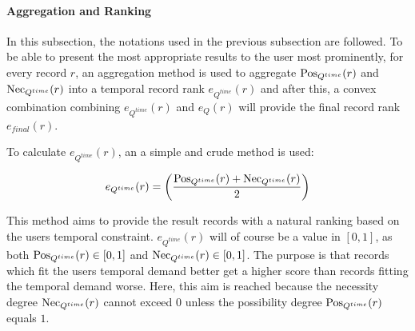 %
%
%



\paragraph{\textbf{Aggregation and Ranking}} 
In this subsection, the notations used in the previous subsection are followed. To be able to present the most appropriate results to the user most prominently, for every record $r$, an aggregation method is used to aggregate $\operatorname{Pos}_{Q^{time}}(r)$ and $\operatorname{Nec}_{Q^{time}}(r)$ into a temporal record rank $e_{Q^{time}}(r)$ and after this, a convex combination combining $e_{Q^{time}}(r)$ and $e_{Q}(r)$ will provide the final record rank $e_{final}(r)$.


To calculate $e_{Q^{time}}(r)$, an a simple and crude method is used:

\begin{equation}
\label{eq:temporal-eval}
e_{Q^{time}}(r) = \left(\frac{\Pos_{Q^{time}}(r)+\Nec_{Q^{time}}(r)}{2}\right)
\end{equation}

This method aims to provide the result records with a natural ranking based on the users temporal constraint. $e_{Q^{time}}(r)$ will of course be a value in $\left[0,1\right]$, as both $\operatorname{Pos}_{Q^{time}}(r) \in \left[0,1\right]$ and $\operatorname{Nec}_{Q^{time}}(r) \in \left[0,1\right]$. The purpose is that records which fit the users temporal demand better get a higher score than records fitting the temporal demand worse. Here, this aim is reached because the necessity degree $\operatorname{Nec}_{Q^{time}}(r)$ cannot exceed $0$ unless the possibility degree $\operatorname{Pos}_{Q^{time}}(r)$ equals $1$.

